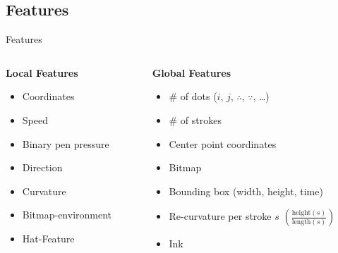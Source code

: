 \subsection{Features}
\begin{frame}{Features}
    \begin{columns}[T] %
    \begin{column}[T]{5cm} %
        \textbf{Local Features}
        \begin{itemize}
            \item Coordinates
            \item Speed
            \item Binary pen pressure
            \item Direction
            \item Curvature
            \item Bitmap-environment
            \item Hat-Feature
        \end{itemize}
    \end{column}
    \begin{column}[T]{6cm} %
        \textbf{Global Features}
        \begin{itemize}
            \item \# of dots ($i$, $j$, $\therefore$, $\because$, \dots)
            \item \# of strokes
            \item Center point coordinates
            \item Bitmap
            \item Bounding box (width, height, time)
            \item Re-curvature per stroke $s$ $\left ( \frac{\text{height}(s)}{\text{length}(s)} \right )$
            \item Ink
        \end{itemize}
    \end{column}
    \end{columns}
\end{frame}